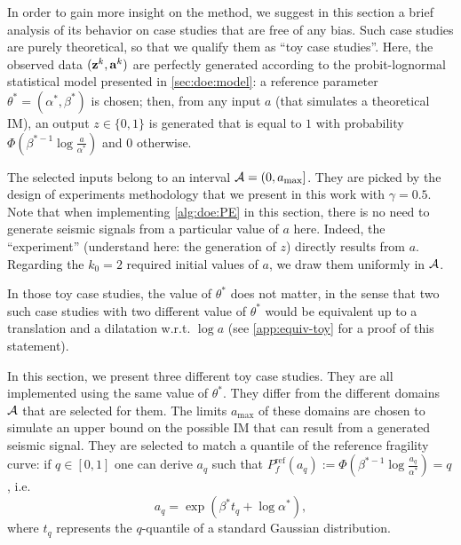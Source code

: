     In order to gain more insight on the method, we suggest in this section a brief analysis of its behavior on case studies that are free of any bias. 
    Such case studies are purely theoretical, so that we qualify them as ``toy case studies''. Here, the observed data $(\mathbf{z}^k,\mathbf{a}^k)$ are perfectly generated according to the probit-lognormal statistical model presented in \cref{sec:doe:model}:
    a reference parameter $\theta^\ast=(\alpha^\ast,\beta^\ast)$ is chosen; then, from any input $a$ (that simulates a theoretical IM), an output $z\in\{0,1\}$ is generated that is equal to $1$ with probability $\Phi\left(\beta^{\ast -1}\log\frac{a}{\alpha^{\ast}}\right)$ and $0$ otherwise.
    
    The selected inputs belong to an interval $\mathcal{A}=(0,a_{\text{max}}]$.
    They are picked by the {design} of experiments methodology that we present in this work with $\gamma=0.5$. Note that when implementing \cref{alg:doe:PE} in this section, there is no need to generate seismic signals from a particular value of $a$ here. Indeed, the ``experiment'' (understand here: the generation of $z$) directly results from $a$.
    Regarding the $k_0=2$ required initial values of $a$, we draw them uniformly in $\mathcal{A}$.
    
    In those toy case studies, the value of $\theta^\ast$ does not matter, in the sense that two such case studies with two different value of $\theta^\ast$ would be equivalent up to a translation and a dilatation w.r.t. $\log a$ (see \cref{app:equiv-toy} for a proof of this statement).
    
    In this section, we present three different toy case studies. They are all implemented using the same value of $\theta^\ast$. 
    They differ from the different domains $\mathcal{A}$ that are selected for them.
    The limits $a_{\text{max}}$ of these domains are chosen to simulate an upper bound 
    on the possible IM that can result from a generated seismic signal.
    They are selected to match a quantile of the reference fragility curve: if $q\in[0,1]$ one can derive $a_q$ such that $P^{\text{ref}}_f(a_q):=\Phi\left(\beta^{\ast -1}\log\frac{a_q}{\alpha^{\ast}}\right)=q$, i.e.
        \begin{equation}
            a_q = \exp\left( \beta^\ast t_q+\log\alpha^\ast \right),
        \end{equation}
    where $t_q$ represents the $q$-quantile of a standard Gaussian distribution.
    
